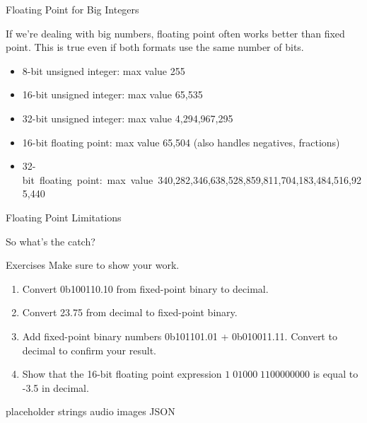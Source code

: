 \begin{frame}{Floating Point for Big Integers}

    If we're dealing with big numbers, floating point often works better than fixed
    point. This is true even if both formats use the same number of bits.

    \begin{itemize}
        \item 8-bit unsigned integer: max value 255
        \item 16-bit unsigned integer: max value 65,535
        \item 32-bit unsigned integer: max value 4,294,967,295
        \item 16-bit floating point: max value 65,504 (also handles negatives, fractions)
        \item \mbox{32-bit floating point: max value 340,282,346,638,528,859,811,704,183,484,516,925,440}
    \end{itemize}

\end{frame}

\begin{frame}{Floating Point Limitations}

    So what's the catch?

\end{frame}

\begin{frame}{Exercises}
    Make sure to show your work.
    \begin{enumerate}
        \item Convert 0b100110.10 from fixed-point binary to decimal.
        \item Convert 23.75 from decimal to fixed-point binary.
        \item Add fixed-point binary numbers 0b101101.01 + 0b010011.11. Convert to decimal to
              confirm your result.
        \item Show that the 16-bit floating point expression ${1 \; 01000 \; 1100000000}$ is
              equal to -3.5 in decimal.
    \end{enumerate}
\end{frame}


\begin{frame}{placeholder}
    strings
    audio
    images
    JSON
\end{frame}

